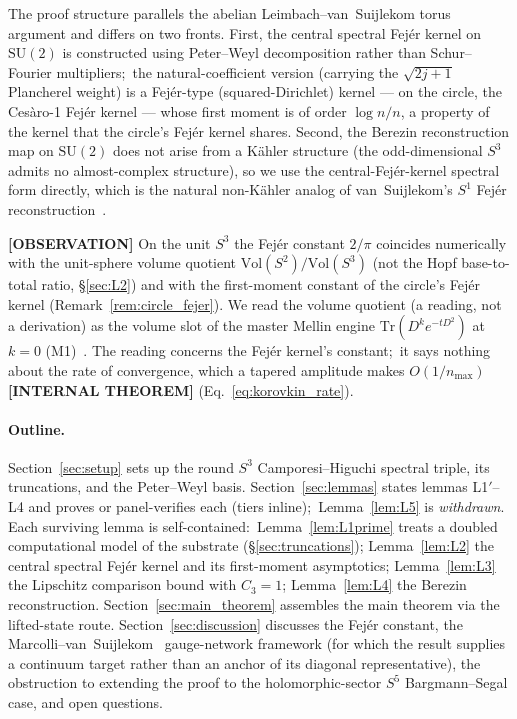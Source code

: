 \documentclass[11pt,a4paper]{article}
\theoremstyle{plain}
\theoremstyle{definition}
\newcommand{\nmax}{n_{\max}}
\newcommand{\sthree}{S^{3}}
\newcommand{\SU}{\mathrm{SU}}
\newcommand{\Vol}{\mathrm{Vol}}
\newcommand{\Tr}{\mathrm{Tr}}
\begin{document}
The proof structure parallels the abelian Leimbach--van~Suijlekom
torus argument and differs on two fronts. First, the central
spectral Fej\'er kernel on $\SU(2)$ is constructed using
Peter--Weyl decomposition rather than Schur--Fourier multipliers;\ the
natural-coefficient version (carrying the $\sqrt{2j+1}$ Plancherel
weight) is a Fej\'er-type (squared-Dirichlet) kernel --- on the
circle, the Ces\`aro-1 Fej\'er kernel --- whose first moment is of
order $\log n / n$, a property of the kernel that the circle's Fej\'er
kernel shares. Second, the Berezin reconstruction map on $\SU(2)$ does not
arise from a K\"ahler structure (the odd-dimensional $\sthree$ admits no
almost-complex structure), so we use the central-Fej\'er-kernel
spectral form directly, which is the natural non-K\"ahler analog of
van~Suijlekom's $S^1$ Fej\'er reconstruction~\cite{vs2021_jgp}.

\textbf{[OBSERVATION]} On the unit $\sthree$ the Fej\'er constant
$2/\pi$ coincides numerically with the unit-sphere volume quotient
$\Vol(S^2)/\Vol(\sthree)$ (not the Hopf base-to-total ratio,
\S\ref{sec:L2}) and with the first-moment constant of the circle's
Fej\'er kernel (Remark~\ref{rem:circle_fejer}).  We read the volume
quotient (a reading, not a derivation) as the volume slot of the master Mellin engine
$\Tr (D^k e^{-tD^2})$ at $k = 0$ (M1)~\cite{paper18}.  The reading
concerns the Fej\'er kernel's constant;\ it says nothing about the rate
of convergence, which a tapered amplitude makes $O(1/\nmax)$
\textbf{[INTERNAL THEOREM]} (Eq.~\eqref{eq:korovkin_rate}).

\paragraph{Outline.}
Section~\ref{sec:setup} sets up the round $\sthree$
Camporesi--Higuchi spectral triple, its truncations, and the Peter--Weyl
basis. Section~\ref{sec:lemmas} states lemmas L1$'$--L4 and proves or
panel-verifies each (tiers inline);\ Lemma~\ref{lem:L5}
is \emph{withdrawn}.
Each surviving lemma is self-contained:\ Lemma~\ref{lem:L1prime} treats a
doubled computational model of the substrate (\S\ref{sec:truncations}); Lemma~\ref{lem:L2} the central
spectral Fej\'er kernel and its first-moment asymptotics; Lemma~\ref{lem:L3} the
Lipschitz comparison bound with $C_3 = 1$; Lemma~\ref{lem:L4} the
Berezin reconstruction. Section~\ref{sec:main_theorem} assembles the
main theorem via the lifted-state route. Section~\ref{sec:discussion} discusses the
Fej\'er constant, the Marcolli--van~Suijlekom~\cite{marcolli_vs2014}
gauge-network framework (for which the result supplies a continuum
target rather than an anchor of its diagonal representative), the
obstruction to
extending the proof to the holomorphic-sector $S^5$ Bargmann--Segal
case, and open questions.
\end{document}
